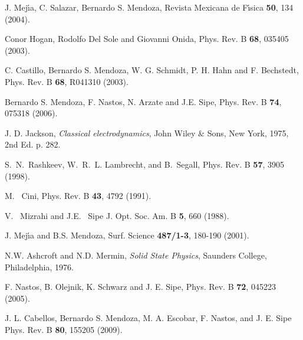 \documentclass[floatfix,prb,aps,superscriptaddress,11pt,preprint]{revtex4}
\begin{document}
\begin{thebibliography}{99}
J. Mej\'{\i}a, C. Salazar, Bernardo S. Mendoza,
Revista Mexicana de F\'{\i}sica
{\bf 50}, 134 (2004).

Conor Hogan, Rodolfo Del Sole and Giovanni Onida, Phys. Rev. B
{\bf 68}, 035405 (2003).

C. Castillo, Bernardo S. Mendoza, W. G. Schmidt, P. H. Hahn and F. Bechstedt,
Phys. Rev. B 
{\bf 68}, R041310 (2003).

Bernardo S. Mendoza, F. Nastos, N. Arzate and J.E. Sipe,
Phys. Rev. B {\bf 74}, 075318 (2006).

 J. D. Jackson, {\it Classical electrodynamics}, John
Wiley {\&} Sons, New York, 1975, 2nd Ed. p. 282.

 S.~N.~Rashkeev, W.~R.~L. Lambrecht, and B.~Segall,
Phys. Rev. B {\bf 57}, 3905 (1998).

 M.~ Cini, Phys. Rev. B {\bf 43}, 4792 (1991).

V.~ Mizrahi and J.E.~ Sipe
J. Opt. Soc. Am. B {\bf 5}, 660 (1988).

J. Mej\'{\i}a and B.S. Mendoza, Surf. Science {\bf 487/1-3},
180-190 (2001).

N.W. Ashcroft and N.D. Mermin, 
{\it Solid State Physics},
Saunders College, Philadelphia, 1976.

F. Nastos, B. Olejnik, K. Schwarz and J. E. Sipe, Phys. Rev. B {\bf 72}, 045223 (2005).

J. L. Cabellos, Bernardo S. Mendoza, M. A. Escobar, F. Nastos, and J. E. Sipe
 Phys. Rev. B {\bf 80}, 155205 (2009).

\end{thebibliography}
\end{document}

